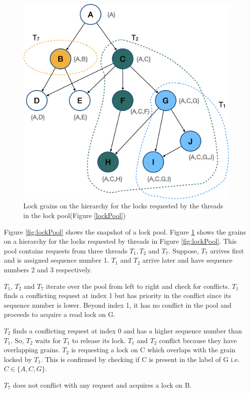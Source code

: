 \begin{figure}
	\centering
	\captionsetup{justification=centering}
	\includegraphics[width=.7\columnwidth]{figures/CALock_Lock_grains_inPool.png}
	\caption{Lock grains on the hierarchy for the locks requested by the threads in the lock pool(Figure \ref{lockPool})}
	\label{fig:lockGrainsOnHierarchy}
\end{figure}

Figure \ref{fig:lockPool} shows the snapshot of a lock pool. Figure \ref{fig:lockGrainsOnHierarchy} shows the grains on a hierarchy for the locks requested by threads in Figure \ref{fig:lockPool}. This pool contains requests from three threads $T_1, T_2$ and $T_7$. Suppose, $T_7$ arrives first and is assigned sequence number 1. $T_1$ and $T_2$ arrive later and have sequence numbers 2 and 3 respectively. 

$T_1$, $T_2$ and $T_7$ iterate over the pool from left to right and check for conflicts. $T_1$ finds a conflicting request at index 1 but has priority in the conflict since its sequence number is lower. Beyond index 1, it has no conflict in the pool and proceeds to acquire a read lock on G.

$T_2$ finds a conflicting request at index 0 and has a higher sequence number than $T_1$. So, $T_2$ waits for $T_1$ to release its lock. $T_1$ and $T_2$ conflict because they have overlapping grains. $T_2$ is requesting a lock on C which overlaps with the grain locked by $T_1$. This is confirmed by checking if C is present in the label of G i.e. $C \in \{A, C, G\}$.

$T_7$ does not conflict with any request and acquires a lock on B.



